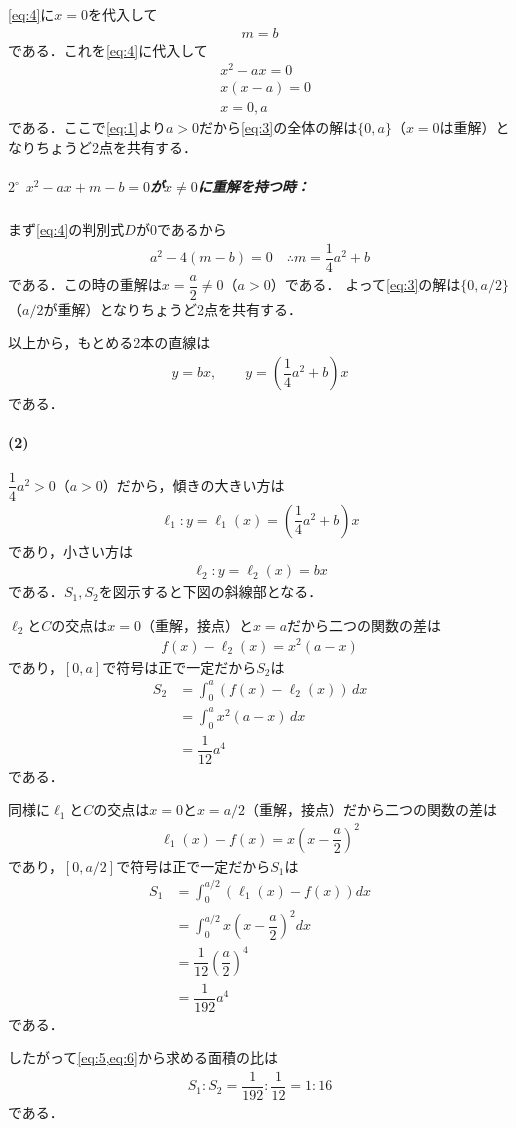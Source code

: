 \documentclass[../../main.tex]{subfiles}
\begin{document}
\cref{eq:4}に$x=0$を代入して
\begin{align}
  m = b
\end{align}
である．これを\cref{eq:4}に代入して
\begin{align}
  &x^2-ax=0 \\
  &x(x-a)=0 \\
  & x = 0, a
\end{align}
である．ここで\cref{eq:1}より$a>0$だから\cref{eq:3}の全体の解は$\{0,a\}$（$x=0$は重解）となりちょうど2点を共有する．

\subparagraph{$2^\circ$ $x^2-ax+m-b=0$が$x\ne0$に重解を持つ時：}

まず\cref{eq:4}の判別式$D$が$0$であるから
\begin{align}
  a^2-4(m-b)=0 \quad \therefore m=\dfrac{1}{4}a^2+b
\end{align}
である．この時の重解は$x=\dfrac{a}{2}\ne0$（$a>0$）である．
よって\cref{eq:3}の解は$\{0,a/2\}$（$a/2$が重解）となりちょうど2点を共有する．
\casesend

以上から，もとめる2本の直線は
\begin{align}
  y=bx,\qquad y=\left(\dfrac{1}{4}a^2+b\right)x
\end{align}
である．

\paragraph{(2)}

$\dfrac{1}{4}a^2>0$（$a>0$）だから，傾きの大きい方は
\begin{align}
  \ell_1: y=\ell_1(x) = \left(\dfrac{1}{4}a^2+b\right)x
\end{align}
であり，小さい方は
\begin{align}
  \ell_2: y=\ell_2(x) = bx
\end{align}
である．$S_1,S_2$を図示すると下図の斜線部となる．

$\ell_2$と$C$の交点は$x=0$（重解，接点）と$x=a$だから二つの関数の差は
\begin{align}
  f(x) - \ell_2(x) = x^2(a-x)
\end{align}
であり，$[0,a]$で符号は正で一定だから$S_2$は
\begin{align}
  S_2
  &= \int_0^a \left(f(x) - \ell_2(x)\right)\,dx \\
  &= \int_0^a x^2(a-x)\,dx \\
  &= \dfrac{1}{12}a^4 \label{eq:5}
\end{align}
である．

同様に$\ell_1$と$C$の交点は$x=0$と$x=a/2$（重解，接点）だから二つの関数の差は
\begin{align}
  \ell_1(x) - f(x) = x\left(x-\dfrac{a}{2}\right)^2
\end{align}
であり，$[0,a/2]$で符号は正で一定だから$S_1$は
\begin{align}
  S_1
  &=\int_0^{a/2}\left(\ell_1(x) - f(x)\right) dx \\
  &=\int_0^{a/2}x\left(x-\dfrac{a}{2}\right)^2dx \\
  &=\dfrac{1}{12}\left(\dfrac{a}{2}\right)^4 \\
  &=\dfrac{1}{192}a^4 \label{eq:6}
\end{align}
である．

したがって\cref{eq:5,eq:6}から求める面積の比は
\begin{align}
  S_1:S_2=\dfrac{1}{192}:\dfrac{1}{12}=1:16
\end{align}
である．

\newpage
\end{document}
